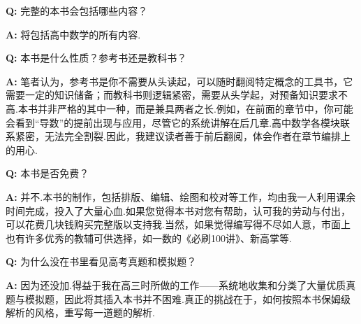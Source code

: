 	\newpage
	\thispagestyle{fancy} 
	
	\begin{center}
		\vspace*{4cm}
		
		
		\vspace{2cm}
	\end{center}

	{\large 
		
		\noindent 
		\textbf{Q: }完整的本书会包括哪些内容？
		\par\vspace{0.3cm} 
		\noindent
		\textbf{A: }将包括高中数学的所有内容.
		
		\par\vspace{1cm} 
		
		\noindent
		\textbf{Q: }本书是什么性质？参考书还是教科书？
		\par\vspace{0.3cm}
		\noindent
		\textbf{A: }笔者认为，参考书是你不需要从头读起，可以随时翻阅特定概念的工具书，它需要一定的知识储备；而教科书则逻辑紧密，需要从头学起，对预备知识要求不高.本书并非严格的其中一种，而是兼具两者之长.例如，在前面的章节中，你可能会看到“导数”的提前出现与应用，尽管它的系统讲解在后几章.高中数学各模块联系紧密，无法完全割裂.因此，我建议读者善于前后翻阅，体会作者在章节编排上的用心.
		
		\par\vspace{1cm}
		
		\noindent
		\textbf{Q: }本书是否免费？
		\par\vspace{0.3cm}
		\noindent
		\textbf{A: }并不.本书的制作，包括排版、编辑、绘图和校对等工作，均由我一人利用课余时间完成，投入了大量心血.如果您觉得本书对您有帮助，认可我的劳动与付出，可以花费几块钱购买完整版以支持我.当然，如果觉得编写得不尽如人意，市面上也有许多优秀的教辅可供选择，如一数的《必刷100讲》、新高掌等.
		
		\par\vspace{1cm}
		
		\noindent
		\textbf{Q: }为什么没在书里看见高考真题和模拟题？
		\par\vspace{0.3cm}
		\noindent
		\textbf{A: }因为还没加.得益于我在高三时所做的工作——系统地收集和分类了大量优质真题与模拟题，因此将其插入本书并不困难.真正的挑战在于，如何按照本书保姆级解析的风格，重写每一道题的解析.
		
}
